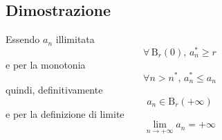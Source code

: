 \documentclass[../../dimostrazioni]{subfiles}
\begin{document}
        \subsection*{Dimostrazione}
            Essendo \(a_n\) illimitata 
            \[\forall \, \mathrm{B}_r(0), \, a_n^* \geqslant r \]
            e per la monotonia
            \[\forall n > n^*, \, a_n^* \leqslant a_n\]
            quindi, definitivamente
            \[a_n \in \mathrm{B}_r(+\infty)\]
            e per la definizione di limite 
            \[\lim_{n \to +\infty} a_n = +\infty\]
\end{document}

